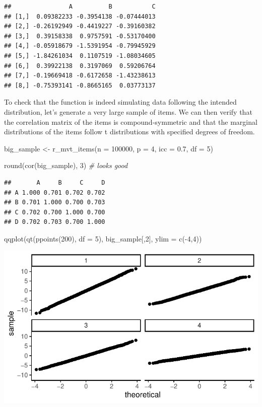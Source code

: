 \documentclass[
]{book}
\newenvironment{Shaded}{\begin{snugshade}}{\end{snugshade}}
\newcommand{\AttributeTok}[1]{\textcolor[rgb]{0.77,0.63,0.00}{#1}}
\newcommand{\CommentTok}[1]{\textcolor[rgb]{0.56,0.35,0.01}{\textit{#1}}}
\newcommand{\DecValTok}[1]{\textcolor[rgb]{0.00,0.00,0.81}{#1}}
\newcommand{\FloatTok}[1]{\textcolor[rgb]{0.00,0.00,0.81}{#1}}
\newcommand{\FunctionTok}[1]{\textcolor[rgb]{0.00,0.00,0.00}{#1}}
\newcommand{\NormalTok}[1]{#1}
\newcommand{\OtherTok}[1]{\textcolor[rgb]{0.56,0.35,0.01}{#1}}
\newcommand{\SpecialCharTok}[1]{\textcolor[rgb]{0.00,0.00,0.00}{#1}}
\begin{document}
\begin{verbatim}
##                A          B           C
## [1,]  0.09382233 -0.3954138 -0.07444013
## [2,] -0.26192949 -0.4419227 -0.39160382
## [3,]  0.39158338  0.9757591 -0.53170400
## [4,] -0.05918679 -1.5391954 -0.79945929
## [5,] -1.84261034  0.1107519 -1.08034605
## [6,]  0.39922138  0.3197069  0.59206764
## [7,] -0.19669418 -0.6172658 -1.43238613
## [8,] -0.75393141 -0.8665165  0.03773137
\end{verbatim}

To check that the function is indeed simulating data following the intended distribution, let's generate a very large sample of items. We can then verify that the correlation matrix of the items is compound-symmetric and that the marginal distributions of the items follow t distributions with specified degrees of freedom.

\begin{Shaded}
\begin{Highlighting}[]
\NormalTok{big\_sample }\OtherTok{\textless{}{-}} \FunctionTok{r\_mvt\_items}\NormalTok{(}\AttributeTok{n =} \DecValTok{100000}\NormalTok{, }\AttributeTok{p =} \DecValTok{4}\NormalTok{, }\AttributeTok{icc =} \FloatTok{0.7}\NormalTok{, }\AttributeTok{df =} \DecValTok{5}\NormalTok{)}

\FunctionTok{round}\NormalTok{(}\FunctionTok{cor}\NormalTok{(big\_sample), }\DecValTok{3}\NormalTok{) }\CommentTok{\# looks good}
\end{Highlighting}
\end{Shaded}

\begin{verbatim}
##       A     B     C     D
## A 1.000 0.701 0.702 0.702
## B 0.701 1.000 0.700 0.703
## C 0.702 0.700 1.000 0.700
## D 0.702 0.703 0.700 1.000
\end{verbatim}

\begin{Shaded}
\begin{Highlighting}[]
\FunctionTok{qqplot}\NormalTok{(}\FunctionTok{qt}\NormalTok{(}\FunctionTok{ppoints}\NormalTok{(}\DecValTok{200}\NormalTok{), }\AttributeTok{df =} \DecValTok{5}\NormalTok{), big\_sample[,}\DecValTok{2}\NormalTok{], }\AttributeTok{ylim =} \FunctionTok{c}\NormalTok{(}\SpecialCharTok{{-}}\DecValTok{4}\NormalTok{,}\DecValTok{4}\NormalTok{))}
\end{Highlighting}
\end{Shaded}

\begin{center}\includegraphics[width=0.75\linewidth]{Designing-Simulations-in-R_files/figure-latex/unnamed-chunk-70-1} \end{center}
\end{document}
